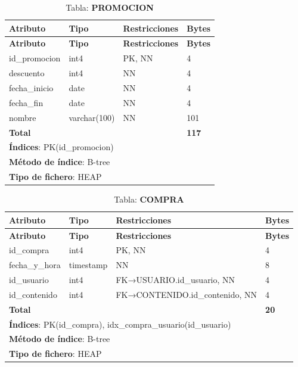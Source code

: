 \begin{longtable}{|l|l|p{5cm}|p{5cm}|}
\caption{Tabla: \textbf{PROMOCION}}\label{pf_promocion}\\ \hline
\textbf{Atributo} & \textbf{Tipo} & \textbf{Restricciones} & \textbf{Bytes}\\ \hline
\endfirsthead
\hline \textbf{Atributo} & \textbf{Tipo} & \textbf{Restricciones} & \textbf{Bytes}\\ \hline
\endhead
id\_promocion & int4         & PK, NN & 4  \\ \hline
descuento     & int4         & NN     & 4  \\ \hline
fecha\_inicio & date         & NN     & 4  \\ \hline
fecha\_fin    & date         & NN     & 4  \\ \hline
nombre        & varchar(100) & NN     & 101\\ \hline
\textbf{Total} &             &        & \textbf{117}\\ \hline
\multicolumn{4}{|l|}{\textbf{Índices}: PK(id\_promocion)} \\ \hline
\multicolumn{4}{|l|}{\textbf{Método de índice}: B-tree}\\ \hline
\multicolumn{4}{|l|}{\textbf{Tipo de fichero}: HEAP}\\ \hline
\end{longtable}

\begin{longtable}{|l|l|p{5cm}|p{5cm}|}
\caption{Tabla: \textbf{COMPRA}}\label{pf_compra}\\ \hline
\textbf{Atributo} & \textbf{Tipo} & \textbf{Restricciones} & \textbf{Bytes}\\ \hline
\endfirsthead
\hline \textbf{Atributo} & \textbf{Tipo} & \textbf{Restricciones} & \textbf{Bytes}\\ \hline
\endhead
id\_compra     & int4      & PK, NN                         & 4  \\ \hline
fecha\_y\_hora & timestamp & NN                             & 8  \\ \hline
id\_usuario    & int4      & FK→USUARIO.id\_usuario, NN     & 4  \\ \hline
id\_contenido  & int4      & FK→CONTENIDO.id\_contenido, NN & 4  \\ \hline
\textbf{Total} &           &                                & \textbf{20}\\ \hline
\multicolumn{4}{|l|}{\textbf{Índices}: PK(id\_compra), idx\_compra\_usuario(id\_usuario)} \\ \hline
\multicolumn{4}{|l|}{\textbf{Método de índice}: B-tree}\\ \hline
\multicolumn{4}{|l|}{\textbf{Tipo de fichero}: HEAP}\\ \hline
\end{longtable}

